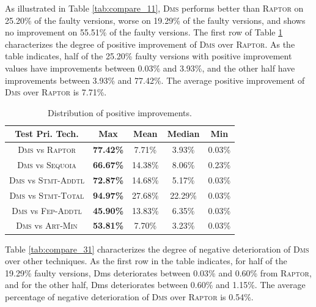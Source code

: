 As illustrated in Table \ref{tab:compare_11}, \textsc{Dms} performs
better than \textsc{Raptor} on 25.20\% of the faulty versions, worse
on 19.29\% of the faulty versions, and shows no improvement
on 55.51\% of the faulty versions. The first row of
Table \ref{tab:compare_21} characterizes the degree of positive improvement of
\textsc{Dms} over \textsc{Raptor}. As the table indicates, half of the 25.20\%
faulty versions with positive improvement values have improvements
between 0.03\% and 3.93\%, and the other half
have improvements between 3.93\% and 77.42\%. The average
positive improvement of \textsc{Dms} over \textsc{Raptor} is 7.71\%.

\begin{table}[tbp]
    \centering
		\caption{Distribution of positive improvements.}
		\renewcommand{\arraystretch}{1.5}
		\small
        \begin{tabular}{|c|c|c|c|c|}
			\hline
			Test Pri. Tech.  &        Max &       Mean &     Median &        Min \\
			\hline\hline
			\textsc{Dms} vs \textsc{Raptor} & {\bf 77.42\%} &     7.71\% &     3.93\% &     0.03\% \\
			\hline
			\textsc{Dms} vs \textsc{Sequoia} & {\bf 66.67\%} &    14.38\% &     8.06\% &     0.23\% \\
			\hline
			\textsc{Dms} vs \textsc{Stmt-Addtl} & {\bf 72.87\%} &    14.68\% &     5.17\% &     0.03\% \\
			\hline
			\textsc{Dms} vs \textsc{Stmt-Total} & {\bf 94.97\%} &    27.68\% &    22.29\% &     0.03\% \\
			\hline
			\textsc{Dms} vs \textsc{Fep-Addtl} & {\bf 45.90\%} &    13.83\% &     6.35\% &     0.03\% \\
			\hline
			\textsc{Dms} vs \textsc{Art-Min} & {\bf 53.81\%} &     7.70\% &     3.23\% &     0.03\% \\
			\hline
		\end{tabular}
    \label{tab:compare_21}
\end{table}

Table \ref{tab:compare_31} characterizes the degree of negative deterioration of
\textsc{Dms} over other techniques. As the first row in the table indicates, for half of the 19.29\%
faulty versions, {\sc Dms} deteriorates 
between 0.03\% and 0.60\% from \textsc{Raptor}, and for the other half,
{\sc Dms} deteriorates between 0.60\% and 1.15\%. The average
percentage of negative deterioration of \textsc{Dms} over \textsc{Raptor} is 0.54\%.

